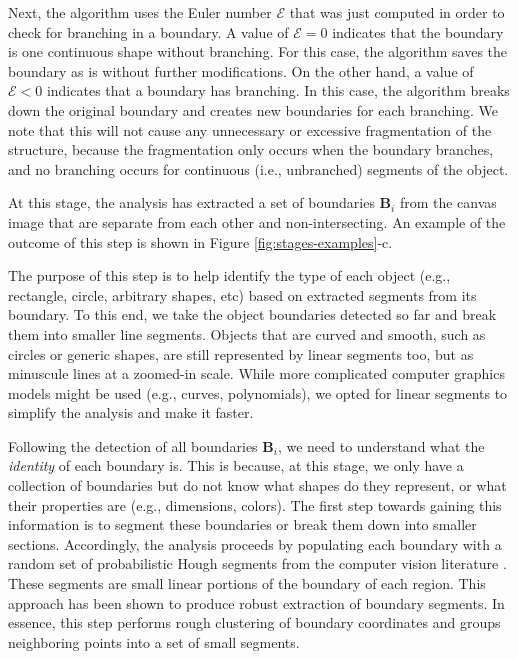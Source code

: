 Next, the algorithm uses the Euler number $\mathcal{E}$ that was just computed in order to check for branching in a boundary. A value of $\mathcal{E} = 0$ indicates that the boundary is one continuous shape without branching. For this case, the algorithm saves the boundary as is without further modifications. On the other hand, a value of $\mathcal{E} < 0$ indicates that a boundary has branching. In this case, the algorithm breaks down the original boundary and creates new boundaries for each branching. We note that this will not cause 
any unnecessary or excessive fragmentation of the structure, 
because the fragmentation only occurs when the boundary branches, 
and no branching occurs for continuous (i.e., unbranched) segments 
of the object.  

At this stage, the analysis has extracted a set of boundaries $\mathbf{B}_i$ from the canvas image that are separate from each other and non-intersecting.  
An example of the outcome of this step is shown in Figure \ref{fig:stages-examples}-c.

The purpose of this step is to help identify the type of each object (e.g., rectangle, circle, arbitrary shapes, etc) based on extracted segments from its boundary. To this end, we take the object boundaries detected so far and break them into smaller line segments.  Objects that are curved and smooth, such as circles or generic shapes, are still represented by linear segments too, but as minuscule lines at a zoomed-in scale. While more complicated computer graphics models might be used (e.g., curves, polynomials), we opted 
for linear segments to simplify the analysis and make it faster. 

Following the detection of all boundaries $\mathbf{B}_i$, 
we need to understand what the \emph{identity} of each boundary is. 
This is because, at this stage, we only have a collection of boundaries but do not know what shapes do they represent, or 
what their properties are (e.g., dimensions, colors). 
The first step towards gaining this information is to segment these boundaries or break them down into smaller sections. 
Accordingly, the analysis proceeds by populating each boundary with a random set of probabilistic Hough segments from the computer vision literature \cite{matas2000robust}. These segments are small linear portions of the boundary of each region. This approach has been shown \cite{kiryati2000randomized} to produce robust extraction of boundary segments. In essence, this step performs rough clustering of boundary coordinates and groups neighboring points into a set of small segments.

